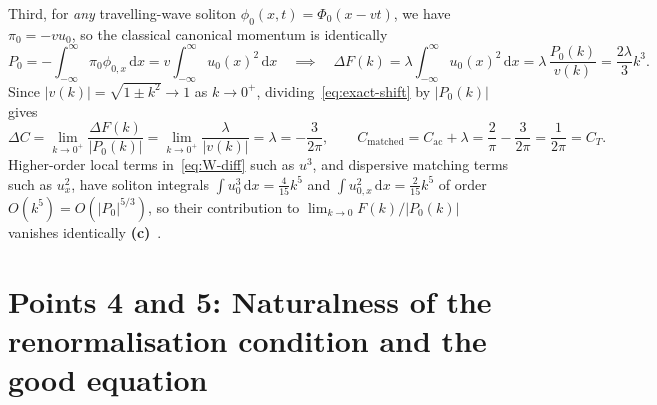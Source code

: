 \documentclass[11pt,a4paper]{article}
\newcommand{\Lc}{\textbf{(c)}\ }
\newcommand{\dd}{\mathrm d}
\begin{document}
Third, for \emph{any} travelling-wave soliton $\phi_0(x,t) = \Phi_0(x-vt)$, we have
$\pi_0 = -vu_0$, so the classical canonical momentum is identically
\begin{equation}
  P_0 = -\int_{-\infty}^{\infty}\pi_0\phi_{0,x}\,\dd x = v\int_{-\infty}^{\infty} u_0(x)^2\,\dd x
  \quad\implies\quad
  \Delta F(k) = \lambda\int_{-\infty}^{\infty} u_0(x)^2\,\dd x = \lambda\,\frac{P_0(k)}{v(k)} = \frac{2\lambda}{3}k^3.
  \label{eq:exact-shift}
\end{equation}
Since $|v(k)| = \sqrt{1\pm k^2} \to 1$ as $k\to 0^+$, dividing~\eqref{eq:exact-shift}
by $|P_0(k)|$ gives
\begin{equation}
  \Delta C = \lim_{k\to 0^+}\frac{\Delta F(k)}{|P_0(k)|}
  = \lim_{k\to 0^+}\frac{\lambda}{|v(k)|} = \lambda = -\frac{3}{2\pi},
  \qquad
  C_{\mathrm{matched}} = C_{\mathrm{ac}} + \lambda = \frac{2}{\pi} - \frac{3}{2\pi} = \frac{1}{2\pi} = C_T.
\end{equation}
Higher-order local terms in~\eqref{eq:W-diff} such as $u^3$, and dispersive matching
terms such as $u_x^2$, have soliton integrals $\int u_0^3\,\dd x = \frac{4}{15}k^5$
and $\int u_{0,x}^2\,\dd x = \frac{2}{15}k^5$ of order $O(k^5) = O(|P_0|^{5/3})$, so
their contribution to $\lim_{k\to 0}F(k)/|P_0(k)|$ vanishes identically \Lc.

\section{Points 4 and 5: Naturalness of the renormalisation condition and the good equation}
\end{document}
